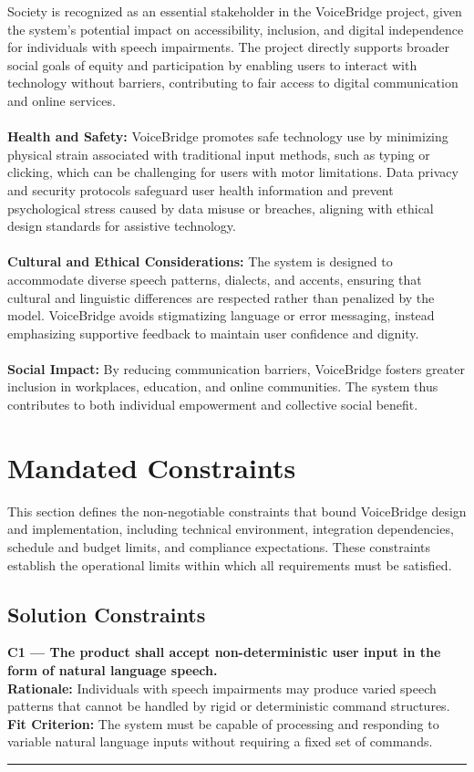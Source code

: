 \documentclass[11pt]{article}
\begin{document}
Society is recognized as an essential stakeholder in the VoiceBridge project, given the system’s potential impact on accessibility, inclusion, and digital independence for individuals with speech impairments. The project directly supports broader social goals of equity and participation by enabling users to interact with technology without barriers, contributing to fair access to digital communication and online services.
\\\\
\textbf{Health and Safety:} 
VoiceBridge promotes safe technology use by minimizing physical strain associated with traditional input methods, such as typing or clicking, which can be challenging for users with motor limitations. Data privacy and security protocols safeguard user health information and prevent psychological stress caused by data misuse or breaches, aligning with ethical design standards for assistive technology.
\\\\
\textbf{Cultural and Ethical Considerations:} 
The system is designed to accommodate diverse speech patterns, dialects, and accents, ensuring that cultural and linguistic differences are respected rather than penalized by the model. VoiceBridge avoids stigmatizing language or error messaging, instead emphasizing supportive feedback to maintain user confidence and dignity.
\\\\
\textbf{Social Impact:} 
By reducing communication barriers, VoiceBridge fosters greater inclusion in workplaces, education, and online communities. The system thus contributes to both individual empowerment and collective social benefit.

\section{Mandated Constraints}
This section defines the non-negotiable constraints that bound VoiceBridge design and implementation, including technical environment, integration dependencies, schedule and budget limits, and compliance expectations. These constraints establish the operational limits within which all requirements must be satisfied.


\subsection{Solution Constraints}

\noindent\textbf{C1 — The product shall accept non-deterministic user input in the form of natural language speech.}\\
\textbf{Rationale:} Individuals with speech impairments may produce varied speech patterns that cannot be handled by rigid or deterministic command structures.\\
\textbf{Fit Criterion:} The system must be capable of processing and responding to variable natural language inputs without requiring a fixed set of commands.
\par\noindent\rule{\textwidth}{0.4pt}
\end{document}
